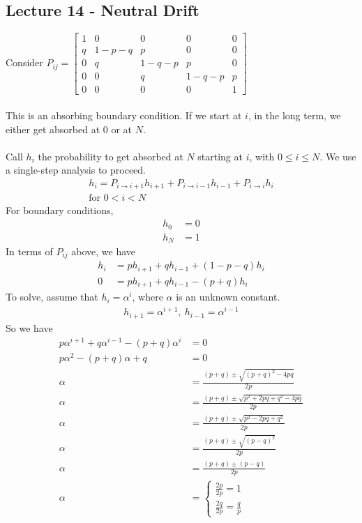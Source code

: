 \documentclass[12pt, letterpaper]{article}
\begin{document}
\subsection{Lecture 14 - Neutral Drift}
Consider $P_{ij} = \begin{bmatrix}
    1 & 0 & 0 & 0 & 0\\
    q & 1-p-q & p & 0 & 0\\
    0 & q & 1-q-p & p & 0 \\
    0 & 0 & q & 1-q-p & p \\
    0 & 0 & 0 & 0 & 1
\end{bmatrix}$ \\ \\
This is an absorbing boundary condition. If we start at $i$, in the long term, we 
either get absorbed at 0 or at $N$. \\ \\
Call $h_i$ the probability to get absorbed at $N$ starting at $i$, with $0 \le i \le N$. We use a single-step
analysis to proceed.
\begin{align*}
    h_i = P_{i\rightarrow i+1}h_{i+1} + P_{i\rightarrow i-1}h_{i-1} + P_{i\rightarrow i}h_i \\
    \text{for } 0 < i < N
\end{align*}
For boundary conditions,
\begin{align*}
    h_0 &= 0 \\
    h_N &= 1
\end{align*}
In terms of $P_{ij}$ above, we have 
\begin{align*}
    h_i &= ph_{i+1} + qh_{i-1} + (1-p-q)h_i \\
    0 &= ph_{i+1} + qh_{i-1} - (p+q)h_i
\end{align*}
To solve, assume that $h_i = \alpha^i$, where $\alpha$ is an unknown constant.
\begin{align*}
    h_{i+1} = \alpha^{i+1},\ h_{i-1} = \alpha ^{i-1}
\end{align*}
So we have 
\begin{align*}
    p\alpha^{i+1}+q\alpha^{i-1} - (p+q)\alpha^i &= 0 \\
    p\alpha^2 - (p+q)\alpha + q &= 0 \\
    \alpha &= \frac{(p+q)\pm \sqrt{(p+q)^2 -4pq}}{2p} \\
    \alpha &= \frac{(p+q)\pm \sqrt{p^2+2pq+q^2 -4pq}}{2p} \\
    \alpha &= \frac{(p+q)\pm \sqrt{p^2-2pq+q^2}}{2p} \\
    \alpha &= \frac{(p+q)\pm \sqrt{(p-q)^2}}{2p} \\
    \alpha &= \frac{(p+q)\pm (p-q)}{2p} \\
    \alpha &= \begin{cases}
        \frac{2p}{2p} = 1 \\
        \frac{2q}{2p} = \frac{q}{p}
    \end{cases}
\end{align*}
\end{document}
